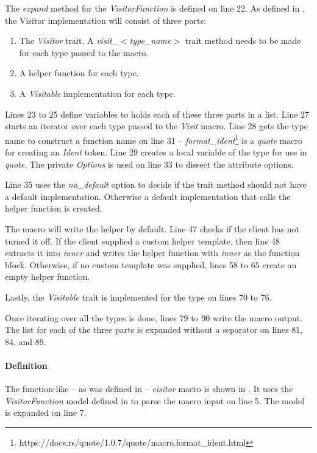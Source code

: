 The \textit{expand} method for the \textit{VisitorFunction} is defined on line 22.
As defined in , the Visitor implementation will consist of three parts:

\begin{enumerate}
	\item The \textit{Visitor} trait.
	      A \textit{visit\_$<$type\_name$>$} trait method needs to be made for each type passed to the macro.
	\item A helper function for each type.
	\item A \textit{Visitable} implementation for each type.
\end{enumerate}

Lines 23 to 25 define variables to holds each of these three parts in a list.
Line 27 starts an iterator over each type passed to the \textit{Visit} macro.
Line 28 gets the type name to construct a function name on line 31 -- \textit{format\_ident}\footnote{https://docs.rs/quote/1.0.7/quote/macro.format\_ident.html} is a \textit{quote} macro for creating an \textit{Ident} token.
Line 29 creates a local variable of the type for use in \textit{quote}.
The private \textit{Options} is used on line 33 to dissect the attribute options.

Line 35 uses the \textit{no\_default} option to decide if the trait method should not have a default implementation.
Otherwise a default implementation that calls the helper function is created.

The macro will write the helper by default.
Line 47 checks if the client has not turned it off.
If the client supplied a custom helper template, then line 48 extracts it into \textit{inner} and writes the helper function with \textit{inner} as the function block.
Otherwise, if no custom template was supplied, lines 58 to 65 create an empty helper function.

Lastly, the \textit{Visitable} trait is implemented for the type on lines 70 to 76.

Once iterating over all the types is done, lines 79 to 90 write the macro output.
The list for each of the three parts is expanded without a separator on lines 81, 84, and 89.

\paragraph{Definition}
The function-like -- as was defined in  -- \textit{visitor} macro is shown in .
It uses the \textit{VisitorFunction} model defined in  to parse the macro input on line 5.
The model is expanded on line 7.

